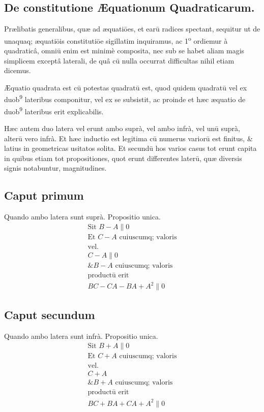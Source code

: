 \documentclass[11pt,a4paper]{article}
\begin{document}
\subsection*{De constitutione Æquationum Quadraticarum.}

Prælibatis generalibus, quæ ad æquatiōes, et earū radices spectant, sequitur ut de unaquaq; æquatiōis constitutiōe sigillatim inquiramus, ac 1\textsuperscript{o} ordiemur à quadraticâ, omniū enim est minimè composita, nec sub se habet aliam magis simplicem exceptâ laterali, de quâ cū nulla occurrat difficultas nihil etiam dicemus.

Æquatio quadrata est cū potestas quadratū est, quod quidem quadratū vel ex duob\textsuperscript{9} lateribus componitur, vel ex se subsistit, ac proinde et hæc æquatio de duob\textsuperscript{9} lateribus erit explicabilis.

Hæc autem duo latera vel erunt ambo suprà, vel ambo infrà, vel unū suprà, alterū vero infrà. Et hæc inductio est legitima cū numerus variorū est finitus, \& latius in geometricas usitatos solita. Et secundū hos varios casus tot erunt capita in quibus etiam tot propositiones, quot erunt differentes laterū, quæ diversis signis notabuntur, magnitudines.

\subsection*{Caput primum}

Quando ambo latera sunt suprà. Propositio unica.
\[ \begin{array}{l} \text{Sit } B - A \parallel 0 \\ \text{Et } C - A \text{ cuiuscumq; valoris} \\ \text{vel.} \\ C - A \parallel 0 \\ \text{\& } B - A \text{ cuiuscumq; valoris} \\ \text{productū erit} \\ BC - CA - BA + A^{2} \parallel 0 \end{array} \]

\subsection*{Caput secundum}

Quando ambo latera sunt infrà. Propositio unica.
\[ \begin{array}{l} \text{Sit } B + A \parallel 0 \\ \text{Et } C + A \text{ cuiuscumq; valoris} \\ \text{vel.} \\ C + A \\ \text{\& } B + A \text{ cuiuscumq; valoris} \\ \text{productū erit} \\ BC + BA + CA + A^{2} \parallel 0 \end{array} \]
\end{document}
